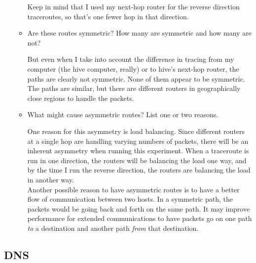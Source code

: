 \documentclass[10pt]{article}
\begin{document}
\begin{enumerate}
\begin{itemize}
Keep in mind that I used my next-hop router for the reverse direction traceroutes, so that's one fewer hop in that direction. \\

\item Are these routes symmetric? How many are symmetric and how many are not?

But even when I take into account the difference in tracing from my computer (the hive computer, really) or to hive's next-hop router, the paths are clearly not symmetric.  None of them appear to be symmetric.  The paths are similar, but there are different routers in geographically close regions to handle the packets. 

\item What might cause asymmetric routes? List one or two reasons.

One reason for this asymmetry is load balancing.  Since different routers at a single hop are handling varying numbers of packets, there will be an inherent asymmetry when running this experiment.  When a traceroute is run in one direction, the routers will be balancing the load one way, and by the time I run the reverse direction, the routers are balancing the load in another way. \\

Another possible reason to have asymmetric routes is to have a better flow of communication between two hosts.  In a symmetric path, the packets would be going back and forth on the same path.  It may improve performance for extended communications to have packets go on one path \textit{to} a destination and another path \textit{from} that destination. \\

\end{itemize}
\end{enumerate}

\newpage
\subsection*{DNS}
\end{document}
